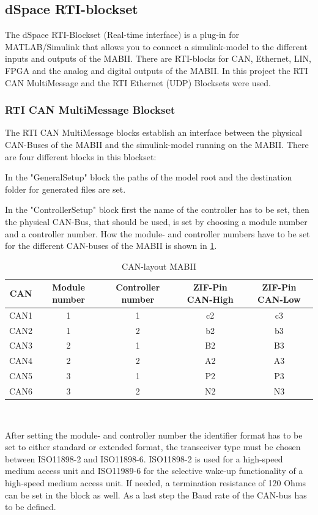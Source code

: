 \documentclass[ExampleMasters.tex]{subfiles}
\begin{document}
\subsection{dSpace RTI-blockset}
The dSpace RTI-Blockset (Real-time interface) is a plug-in for MATLAB/Simulink that allows you to connect a simulink-model to the different inputs and outputs of the MABII. There are RTI-blocks for CAN, Ethernet, LIN, FPGA and the analog and digital outputs of the MABII.
In this project the RTI CAN MultiMessage and the RTI Ethernet (UDP) Blocksets were used.\\ 
\subsubsection{RTI CAN MultiMessage Blockset}
The RTI CAN MultiMessage blocks establish an interface between the physical CAN-Buses of the MABII and the simulink-model running on the MABII. There are four different blocks in this blockset: 

In the "GeneralSetup" block the paths of the model root and the destination folder for generated files are set. 

In the "ControllerSetup" block first the name of the controller has to be set, then the physical CAN-Bus, that should be used, is set by choosing a module number and a controller number. How the module- and controller numbers have to be set for the different CAN-buses of the MABII is shown in \ref{tab:CAN-layout}.
\begin{table}[h]
	\centering
	\caption{CAN-layout MABII}
	\label{tab:CAN-layout}
	\begin{tabular}{c|c|c|c|c|}
		CAN   & Module number & Controller number & ZIF-Pin CAN-High & ZIF-Pin CAN-Low  \\ \hline
		CAN1     &       1 & 1  & c2 & c3         \\
		CAN2   &      1 & 2  & b2 & b3    \\
		CAN3 &      2 & 1 & B2 & B3        \\
		CAN4& 2 & 2 & A2 & A3  \\
		CAN5& 3 & 1 & P2 & P3 \\
		CAN6& 3 & 2 & N2 & N3 \\
	\end{tabular} \\
\end{table}

After setting the module- and controller number the identifier format has to be set to either standard or extended format, the transceiver type must be chosen between ISO11898-2 and ISO11898-6. ISO11898-2 is used for a high-speed medium access unit and ISO11989-6 for the selective wake-up functionality of a high-speed medium access unit. If needed, a termination resistance of 120 Ohms can be set in the block as well. As a last step the Baud rate of the CAN-bus has to be defined.
\end{document}
